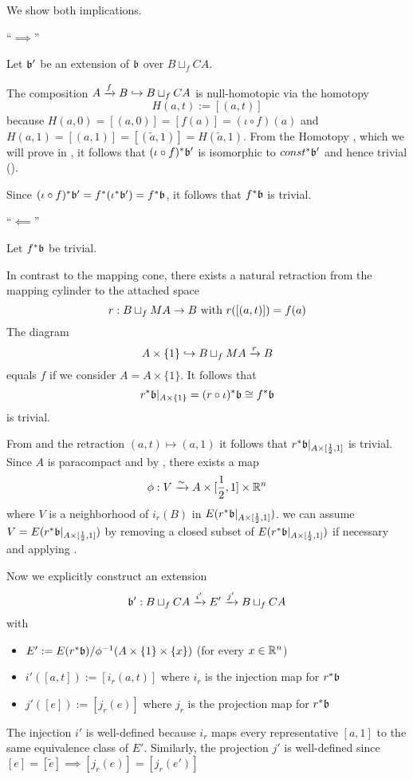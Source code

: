 \begin{myproof}
    We show both implications.

    ``$\implies$''

    Let $\bb'$ be an extension of $\bb$ over $B \sqcup_f CA$.

    The composition $A \xto{f} B \incl B \sqcup_f CA$ is null-homotopic via the homotopy
    \[ H(a, t) := [(a, t)] \]
    because $H(a, 0) = [(a, 0)] = [f(a)] = (\iota \circ f)(a)$ and $H(a, 1) = [(a, 1)] = [(\tilde{a}, 1)] = H(\tilde{a}, 1)$.
    From the Homotopy , which we will prove in ,
    it follows that $(\iota \circ f)^*\bb'$ is isomorphic to $const^*\bb'$ and hence trivial ().

    Since $(\iota \circ f)^*\bb' = f^*(\iota^*\bb') = f^*\bb$, it follows that $f^*\bb$ is trivial.

    ``$\impliedby$''

    Let $f^*\bb$ be trivial.

    In contrast to the mapping cone, there exists a natural retraction from the mapping cylinder to the attached space
    \[ r: B \sqcup_f MA \to B \twith r([(a, t)]) = f(a) \]
    The diagram
    \[ A \times \{1\} \incl B \sqcup_f MA \xto{r} B \]
    equals $f$ if we consider $A = A \times \{1\}$.
    It follows that
    \[ r^*\bb\restr{A \times \{1\}} = (r \circ \iota)^*\bb \cong f^*\bb \]
    is trivial.

    From  and the retraction $(a, t) \mapsto (a, 1)$ it follows that $r^*\bb\restr{A \times [\half, 1]}$ is trivial.
    Since $A$ is paracompact and by , there exists a map
    \[ \phi: V \isomto A \times [\frac{1}{2}, 1] \times \R^n \]
    where $V$ is a neighborhood of $i_r(B)$ in $E(r^*\bb\restr{A \times [\half, 1]})$.
    \Wlog we can assume $V = E(r^*\bb\restr{A \times [\half, 1]})$ by removing a closed subset of $E(r^*\bb\restr{A \times [\half, 1]})$ if necessary and applying .

    Now we explicitly construct an extension
    \[ \bundledef{\bb'}{B \sqcup_f CA}{E'}{i'}{j'} \]
    with
    \begin{itemize}
        \item $E' := E(r^*\bb) / \phi^{-1}(A \times \{1\} \times \{x\})$ (for every $x \in \R^n$)
        \item $i'([a, t]) := [i_r(a, t)]$ where $i_r$ is the injection map for $r^*\bb$
        \item $j'([e]) := [j_r(e)]$ where $j_r$ is the projection map for $r^*\bb$
    \end{itemize}
    The injection $i'$ is well-defined because $i_r$ maps every representative $[a, 1]$ to the same equivalence class of $E'$.
    Similarly, the projection $j'$ is well-defined since $[e] = [\tilde{e}] \implies [j_r(e)] = [j_r(e')]$


\end{myproof}
